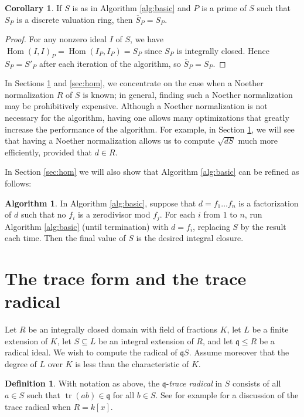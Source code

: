 \documentclass{amsart}
\theoremstyle{definition}
\newtheorem{definition}[theorem]{Definition}
\newtheorem{corollary}[theorem]{Corollary}
\newtheorem{algorithm}[theorem]{Algorithm}
\DeclareMathOperator{\tr}{tr}
\DeclareMathOperator{\Hom}{Hom}
\newcommand{\q}{\mathfrak{q}}
\begin{document}
\begin{corollary}\label{cor:stable}
If $S$ is as in Algorithm \ref{alg:basic} and $P$ is a prime of $S$ such that $S_P$ is a discrete valuation ring, then $\overline{S}_P = S_P$.
\end{corollary}
\begin{proof}
For any nonzero ideal $I$ of $S$, we have $\Hom(I,I)_P = \Hom(I_P,I_P) = S_P$ since $S_P$ is integrally closed.  Hence $S_P = S'_P$ after each iteration of the algorithm, so $\overline{S}_P = S_P$.
\end{proof}

In Sections \ref{sec:trrad} and \ref{sec:hom}, we concentrate on the case when a Noether normalization $R$ of $S$ is known; in general, finding such a Noether normalization may be prohibitively expensive.  Although a Noether normalization is not necessary for the algorithm, having one allows many optimizations that greatly increase the performance of the algorithm.  For example, in Section \ref{sec:trrad}, we will see that having a Noether normalization allows us to compute $\sqrt{dS}$ much more efficiently, provided that $d\in R$.

In Section \ref{sec:hom} we will also show that Algorithm \ref{alg:basic} can be refined as follows:
\begin{algorithm}\label{alg:factored}
In Algorithm \ref{alg:basic}, suppose that $d = f_1\ldots f_n$ is a factorization of $d$ such that no $f_i$ is a zerodivisor mod $f_j$.  For each $i$ from $1$ to $n$, run Algorithm \ref{alg:basic} (until termination) with $d=f_i$, replacing $S$ by the result each time.  Then the final value of $S$ is the desired integral closure.
\end{algorithm}

\section{The trace form and the trace radical}\label{sec:trrad}
Let $R$ be an integrally closed domain with field of fractions $K$, let $L$ be a finite extension of $K$, let $S \subseteq L$ be an integral extension of $R$, and let $\q\leq R$ be a radical ideal.  We wish to compute the radical of $\q S$.  Assume moreover that the degree of $L$ over $K$ is less than the characteristic of $K$.

\begin{definition}
With notation as above, the $\q$-\emph{trace radical} in $S$ consists of all $a \in S$ such that $\tr(ab) \in \q$ for all $b\in S$.  See for example \cite{Tr} for a discussion of the trace radical when $R = k[x]$.
\end{definition}
\end{document}
